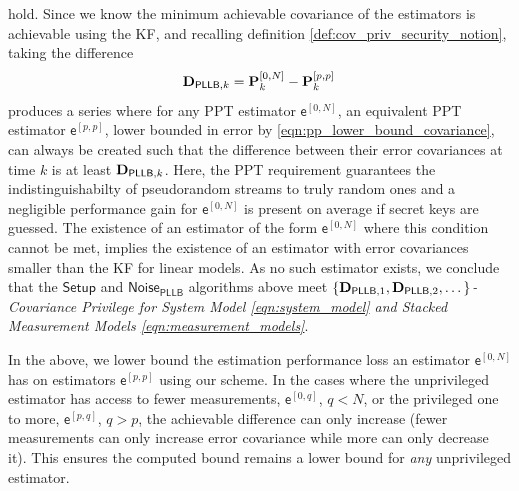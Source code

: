 \documentclass[letterpaper, 10 pt, conference]{ieeeconf}
\begin{document}
hold. Since we know the minimum achievable covariance of the estimators is achievable using the KF, and recalling definition \ref{def:cov_priv_security_notion}, taking the difference 
\begin{equation}\label{eqn:unpriv_priv_pllb_difference_series}
  {\ensuremath{{\mathbf{D}}}}_{\mathsf{PLLB},k} = {{\mathbf{P}}}_k^{[0,N]} - {{\mathbf{P}}}_k^{[p,p]}\,
\end{equation}
produces a series where for any PPT estimator $\mathsf{e}^{[0,N]}$, an equivalent PPT estimator $\mathsf{e}^{[p,p]}$, lower bounded in error by \eqref{eqn:pp_lower_bound_covariance}, can always be created such that the difference between their error covariances at time $k$ is at least ${{\mathbf{D}}}_{\mathsf{PLLB},k}$. Here, the PPT requirement guarantees the indistinguishabilty of pseudorandom streams to truly random ones and a negligible performance gain for $\mathsf{e}^{[0,N]}$ is present on average if secret keys are guessed. The existence of an estimator of the form $\mathsf{e}^{[0,N]}$ where this condition cannot be met, implies the existence of an estimator with error covariances smaller than the KF for linear models. As no such estimator exists, we conclude that the $\mathsf{Setup}$ and $\mathsf{Noise_{\mathsf{PLLB}}}$ algorithms above meet \textit{$\{{{\mathbf{D}}}_{\mathsf{PLLB},1},{{\mathbf{D}}}_{\mathsf{PLLB},2},\dots\}$-Covariance Privilege for System Model \eqref{eqn:system_model} and Stacked Measurement Models \eqref{eqn:measurement_models}}.

In the above, we lower bound the estimation performance loss an estimator $\mathsf{e}^{[0,N]}$ has on estimators $\mathsf{e}^{[p,p]}$ using our scheme. In the cases where the unprivileged estimator has access to fewer measurements, $\mathsf{e}^{[0,q]}$, $q<N$, or the privileged one to more, $\mathsf{e}^{[p,q]}$, $q>p$, the achievable difference can only increase (fewer measurements can only increase error covariance while more can only decrease it). This ensures the computed bound remains a lower bound for \textit{any} unprivileged estimator.

% 
% 
\end{document}
